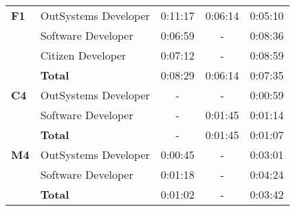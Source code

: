 \begin{table}[tb]
\begin{tabular}{llrcr}
  \textbf{F1}               & OutSystems Developer & 0:11:17                                                           & \multicolumn{1}{r}{0:06:14}                                             & 0:05:10                                                       \\
                            & Software Developer   & 0:06:59                                                           & -                                                                       & 0:08:36                                                       \\
                            & Citizen Developer    & 0:07:12                                                           & -                                                                       & 0:08:59                                                       \\
                            & \textbf{Total}       & 0:08:29                                                           & \multicolumn{1}{r}{0:06:14}                                             & 0:07:35                                                       \\ \hline
  \textbf{C4}               & OutSystems Developer & \multicolumn{1}{c}{-}                                             & -                                                                       & 0:00:59                                                       \\
                            & Software Developer   & \multicolumn{1}{c}{-}                                             & \multicolumn{1}{r}{0:01:45}                                             & 0:01:14                                                       \\
                            & \textbf{Total}       & \multicolumn{1}{c}{-}                                             & \multicolumn{1}{r}{0:01:45}                                             & 0:01:07                                                       \\ \hline
  \textbf{M4}               & OutSystems Developer & 0:00:45                                                           & -                                                                       & 0:03:01                                                       \\
                            & Software Developer   & 0:01:18                                                           & -                                                                       & 0:04:24                                                       \\
                            & \textbf{Total}       & 0:01:02                                                           & -                                                                       & 0:03:42                                                       \\ \hline
  \end{tabular}
  \end{table}

